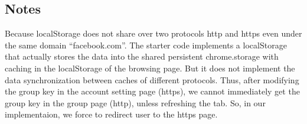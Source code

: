 \subsection{Notes}

Because localStorage does not share over two protocols http and https even under the same domain ``facebook.com''. 
The starter code implements a localStorage that actually stores the data into the shared persistent chrome.storage with caching in the localStorage of the browsing page. But it does not implement the data synchronization between caches of different protocols. Thus, after modifying the group key in the account setting page (https), we cannot immediately get the group key in the group page (http), unless refreshing the tab. So, in our implementaion, we force to redirect user to the https page. 



